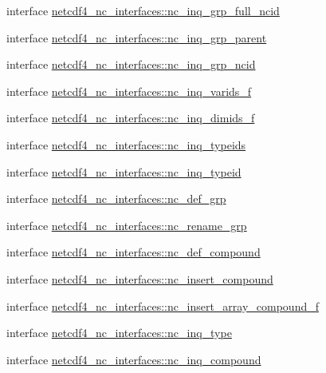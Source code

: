 \begin{DoxyCompactItemize}
interface \hyperlink{interfacenetcdf4__nc__interfaces_1_1nc__inq__grp__full__ncid}{netcdf4\+\_\+nc\+\_\+interfaces\+::nc\+\_\+inq\+\_\+grp\+\_\+full\+\_\+ncid}
\item 
interface \hyperlink{interfacenetcdf4__nc__interfaces_1_1nc__inq__grp__parent}{netcdf4\+\_\+nc\+\_\+interfaces\+::nc\+\_\+inq\+\_\+grp\+\_\+parent}
\item 
interface \hyperlink{interfacenetcdf4__nc__interfaces_1_1nc__inq__grp__ncid}{netcdf4\+\_\+nc\+\_\+interfaces\+::nc\+\_\+inq\+\_\+grp\+\_\+ncid}
\item 
interface \hyperlink{interfacenetcdf4__nc__interfaces_1_1nc__inq__varids__f}{netcdf4\+\_\+nc\+\_\+interfaces\+::nc\+\_\+inq\+\_\+varids\+\_\+f}
\item 
interface \hyperlink{interfacenetcdf4__nc__interfaces_1_1nc__inq__dimids__f}{netcdf4\+\_\+nc\+\_\+interfaces\+::nc\+\_\+inq\+\_\+dimids\+\_\+f}
\item 
interface \hyperlink{interfacenetcdf4__nc__interfaces_1_1nc__inq__typeids}{netcdf4\+\_\+nc\+\_\+interfaces\+::nc\+\_\+inq\+\_\+typeids}
\item 
interface \hyperlink{interfacenetcdf4__nc__interfaces_1_1nc__inq__typeid}{netcdf4\+\_\+nc\+\_\+interfaces\+::nc\+\_\+inq\+\_\+typeid}
\item 
interface \hyperlink{interfacenetcdf4__nc__interfaces_1_1nc__def__grp}{netcdf4\+\_\+nc\+\_\+interfaces\+::nc\+\_\+def\+\_\+grp}
\item 
interface \hyperlink{interfacenetcdf4__nc__interfaces_1_1nc__rename__grp}{netcdf4\+\_\+nc\+\_\+interfaces\+::nc\+\_\+rename\+\_\+grp}
\item 
interface \hyperlink{interfacenetcdf4__nc__interfaces_1_1nc__def__compound}{netcdf4\+\_\+nc\+\_\+interfaces\+::nc\+\_\+def\+\_\+compound}
\item 
interface \hyperlink{interfacenetcdf4__nc__interfaces_1_1nc__insert__compound}{netcdf4\+\_\+nc\+\_\+interfaces\+::nc\+\_\+insert\+\_\+compound}
\item 
interface \hyperlink{interfacenetcdf4__nc__interfaces_1_1nc__insert__array__compound__f}{netcdf4\+\_\+nc\+\_\+interfaces\+::nc\+\_\+insert\+\_\+array\+\_\+compound\+\_\+f}
\item 
interface \hyperlink{interfacenetcdf4__nc__interfaces_1_1nc__inq__type}{netcdf4\+\_\+nc\+\_\+interfaces\+::nc\+\_\+inq\+\_\+type}
\item 
interface \hyperlink{interfacenetcdf4__nc__interfaces_1_1nc__inq__compound}{netcdf4\+\_\+nc\+\_\+interfaces\+::nc\+\_\+inq\+\_\+compound}

\end{DoxyCompactItemize}
